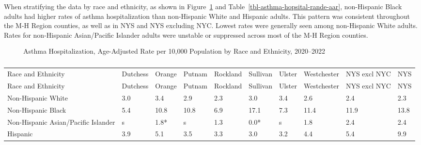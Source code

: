 \documentclass[
  english,
  letterpaper,
]{report}
\begin{document}
When stratifying the data by race and ethnicity, as shown in
Figure~\ref{fig-asthma-hopsital-rande-aar} and
Table~\ref{tbl-asthma-hopsital-rande-aar}, non-Hispanic Black adults had
higher rates of asthma hospitalization than non-Hispanic White and
Hispanic adults. This pattern was consistent throughout the M-H Region
counties, as well as in NYS and NYS excluding NYC. Lowest rates were
generally seen among non-Hispanic White adults. Rates for non-Hispanic
Asian/Pacific Islander adults were unstable or suppressed across most of
the M-H Region counties.

\begin{figure}


\caption{\label{fig-asthma-hopsital-rande-aar}Asthma Hospitalization,
Age-Adjusted Rate per 10,000 Population by Race and Ethnicity,
2020--2022}

\end{figure}%

\begin{longtable}[]{@{}llllllllll@{}}

\caption{\label{tbl-asthma-hopsital-rande-aar}Asthma Hospitalization,
Age-Adjusted Rate per 10,000 Population by Race and Ethnicity,
2020--2022}

\tabularnewline

\caption{}\label{T_60272}\tabularnewline
\toprule\noalign{}
Race and Ethnicity & Dutchess & Orange & Putnam & Rockland & Sullivan &
Ulster & Westchester & NYS excl NYC & NYS \\
\midrule\noalign{}
\endfirsthead
\toprule\noalign{}
Race and Ethnicity & Dutchess & Orange & Putnam & Rockland & Sullivan &
Ulster & Westchester & NYS excl NYC & NYS \\
\midrule\noalign{}
\endhead
\bottomrule\noalign{}
\endlastfoot
Non-Hispanic White & 3.0 & 3.4 & 2.9 & 2.3 & 3.0 & 3.4 & 2.6 & 2.4 &
2.3 \\
Non-Hispanic Black & 5.4 & 10.8 & 10.8 & 6.9 & 17.1 & 7.3 & 11.4 & 11.9
& 13.8 \\
Non-Hispanic Asian/Pacific Islander & s & 1.8* & s & 1.3 & 0.0* & s &
1.8 & 2.4 & 2.4 \\
Hispanic & 3.9 & 5.1 & 3.5 & 3.3 & 3.0 & 3.2 & 4.4 & 5.4 & 9.9 \\

\end{longtable}
\end{document}
